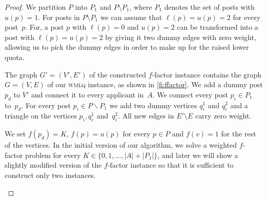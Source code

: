 \documentclass{llncs}
\begin{document}
\begin{proof}

We partition $P$ into $P_1$ and $P \setminus P_1$, where $P_1$ denotes the set of posts with $u(p) = 1$. For posts in $P \setminus P_1$ we can assume that $\ell(p) = u(p) = 2$ for every post~$p$. For, a post $p$ with $\ell(p)=0$ and $u(p) = 2$ can be transformed into a post with $\ell(p) = u(p) = 2$ by giving it two dummy edges with zero weight, allowing us to pick the dummy edges in order to make up for the raised lower quota. 

The graph $G' =(V',E')$ of the constructed $f$-factor instance contains the graph $G =(V,E)$ of our \textsc{wmlq} instance, as shown in \cref{fi:ffactor}. We add a dummy post $p_d$ to $V'$ and connect it to every applicant in~$A$. We connect every post $p_i\in P_1$ to~$p_d$. For every post $p_i\in P\backslash P_1$ we add two dummy vertices $q_i^1$ and $q_i^2$ and a triangle on the vertices $p_i, q_i^1$ and~$q_i^2$. All new edges in $E' \setminus E$ carry zero weight. 

We set $f(p_d) = K$, $f(p) = u(p)$ for every $p \in P$ and $f(v) = 1$ for the rest of the vertices. In the initial version of our algorithm, we solve a weighted $f$-factor problem for every $K \in \{0, 1, ..., |A| + |P_1|\}$, and later we will show a slightly modified version of the $f$-factor instance so that it is sufficient to construct only two instances.
    
\begin{figure}[ht]
\centering
{}
\end{figure}
\end{proof}
\end{document}
